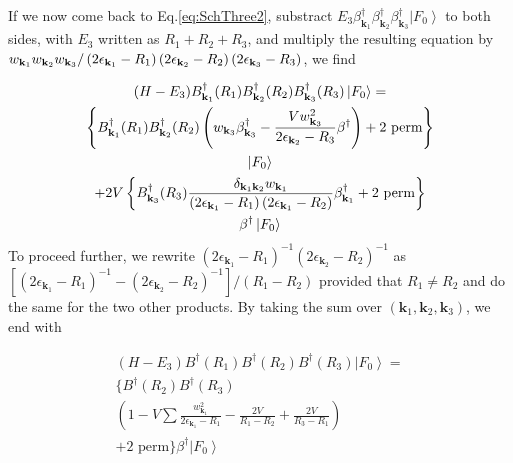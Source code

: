 \documentclass[aps,prb,superscriptaddress,twocolumn]{revtex4}
\begin{document}
If we now come back to Eq.\eqref{eq:SchThree2}, substract $E
_3\beta^{\dagger}_{\mathbf{k} _1}\beta^{\dagger}_{\mathbf{k}
_2}\beta^{\dagger}_{\mathbf{k} _3}\left|F_0\right>  $ to both sides, with $%
E _3$ written as $R_1+R_2+R_3$, and multiply the resulting equation
by $w_{\mathbf{k} _1}w_{\mathbf{k} _2}w_{\mathbf{k} _3}/\left(2\epsilon_{%
\mathbf{k} _1}-R_1\right) \left(2\epsilon_{\mathbf{k} _2}-R_2\right)
\left(2\epsilon_{\mathbf{k} _3}-R_3\right) $, we find

\begin{multline}  \label{eq:SchThree3}
(H-E _3)B^{\dagger}_{\mathbf{k} _1}(R_1)B^{\dagger}_{\mathbf{k}
_2}(R_2)B^{\dagger}_{\mathbf{k} _3}(R_3)\left|F_0\right>  = \\
\left\{B^{\dagger}_{\mathbf{k} _1}(R_1)B^{\dagger}_{\mathbf{k}
_2}(R_2)\left(w_{\mathbf{k} _3}\beta^{\dagger}_{\mathbf{k} _3}-\frac{Vw_{%
\mathbf{k} _3}^2}{2\epsilon_{\mathbf{k} _2}-R_3}\beta^{\dagger}\right) +\text{%
2 perm}\right\}  \\
\left|F_0\right>   \\
+2V\left\{B^{\dagger}_{\mathbf{k} _3}(R_3)\frac{\delta_{\mathbf{k} _1\mathbf{%
k} _2}w_{\mathbf{k} _1}}{\left(2\epsilon_{\mathbf{k} _1}-R_1\right)
\left(2\epsilon_{\mathbf{k} _1}-R_2\right) }\beta^{\dagger}_{\mathbf{k} _1}+%
\text{2 perm}\right\}  \\
\beta^{\dagger}\left|F_0\right>  
\end{multline}
To proceed further, we rewrite $\left(2\epsilon_{\mathbf{k} _1}-R_1\right)
^{-1}\left(2\epsilon_{\mathbf{k} _2}-R_2\right) ^{-1}$ as $\left[%
\left(2\epsilon_{\mathbf{k} _1}-R_1\right) ^{-1}-\left(2\epsilon_{\mathbf{k}
_2}-R_2\right) ^{-1}\right] /\left(R_1-R_2\right) $ provided that $R_1\neq{}%
R_2$ and do the same for the two other products. By taking the sum over $%
\left(\mathbf{k} _1,\mathbf{k} _2,\mathbf{k} _3\right) $, we end with

\begin{multline}  \label{eq:SchThree4}
(H-E _3)B^{\dagger}(R_1)B^{\dagger}(R_2)B^{\dagger}(R_3)\left|F_0%
\right>  = \\
\{B^{\dagger}(R_2)B^{\dagger}(R_3) \\
\left(1-V\sum\frac{w_{\mathbf{k} _1}^2}{2\epsilon_{\mathbf{k} _1}-R_1}-\frac{2V%
}{R_1-R_2}+\frac{2V}{R_3-R_1}\right)  \\
+\text{2 perm}\}\beta^{\dagger}\left|F_0\right>  
\end{multline}
\end{document}
